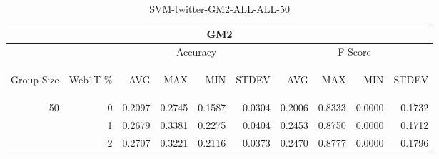 \begin{center}
\begin{table}[htbp] 
 \begin{center}
\begin{tabular}{ | r | r | r | r | r | r | r | r | r | r |}
\hline
\multicolumn{10}{|c|}{GM2}\\
\hline
 & & \multicolumn{4}{|c|}{Accuracy} & \multicolumn{4}{|c|}{F-Score}\\ \cline{3-10}
\begin{sideways}Group Size\end{sideways} & \begin{sideways}Web1T \%\end{sideways} & \begin{sideways}AVG\end{sideways} & \begin{sideways}MAX\end{sideways} & \begin{sideways}MIN\end{sideways} & \begin{sideways}STDEV\end{sideways} & \begin{sideways}AVG\end{sideways} & \begin{sideways}MAX\end{sideways} & \begin{sideways}MIN\end{sideways} & \begin{sideways}STDEV\end{sideways}\\
\hline
\multirow{2}{*}{50}
 & 0 & 0.2097 & 0.2745 & 0.1587 & 0.0304 & 0.2006 & 0.8333 & 0.0000 & 0.1732\\ \cline{2-10}
 & 1 & 0.2679 & 0.3381 & 0.2275 & 0.0404 & 0.2453 & 0.8750 & 0.0000 & 0.1712\\ \cline{2-10}
 & 2 & 0.2707 & 0.3221 & 0.2116 & 0.0373 & 0.2470 & 0.8777 & 0.0000 & 0.1796\\ \cline{2-10}
\hline
\end{tabular}
\caption{SVM-twitter-GM2-ALL-ALL-50}
\label{table:SVM-twitter-GM2-ALL-ALL-50}
\end{center}
 \end{table}
\end{center}

